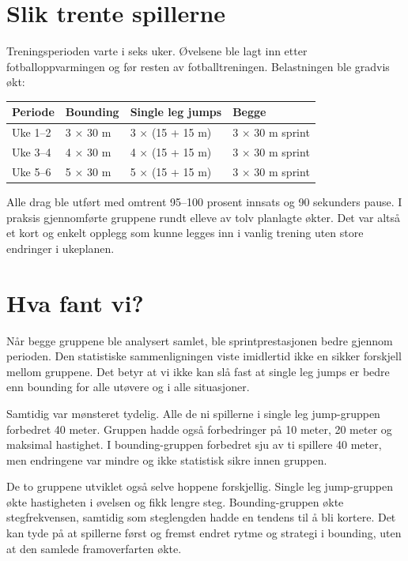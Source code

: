 \section{Slik trente spillerne}\label{slik-trente-spillerne}

Treningsperioden varte i seks uker. Øvelsene ble lagt inn etter fotballoppvarmingen og før resten av fotballtreningen. Belastningen ble gradvis økt:

\begin{center}
\sffamily\footnotesize\setlength{\tabcolsep}{3.5pt}
\begin{tabular}{@{}llll@{}}
\toprule
\textbf{Periode} & \textbf{Bounding} & \textbf{Single leg jumps} & \textbf{Begge} \\
\midrule
Uke 1–2 & 3 × 30 m & 3 × (15 + 15 m) & 3 × 30 m sprint \\
Uke 3–4 & 4 × 30 m & 4 × (15 + 15 m) & 3 × 30 m sprint \\
Uke 5–6 & 5 × 30 m & 5 × (15 + 15 m) & 3 × 30 m sprint \\
\bottomrule
\end{tabular}
\end{center}

Alle drag ble utført med omtrent 95--100 prosent innsats og 90 sekunders pause. I praksis gjennomførte gruppene rundt elleve av tolv planlagte økter. Det var altså et kort og enkelt opplegg som kunne legges inn i vanlig trening uten store endringer i ukeplanen.

\section{Hva fant vi?}\label{hva-fant-vi}

Når begge gruppene ble analysert samlet, ble sprintprestasjonen bedre gjennom perioden. Den statistiske sammenligningen viste imidlertid ikke en sikker forskjell mellom gruppene. Det betyr at vi ikke kan slå fast at single leg jumps er bedre enn bounding for alle utøvere og i alle situasjoner.

Samtidig var mønsteret tydelig. Alle de ni spillerne i single leg jump-gruppen forbedret 40 meter. Gruppen hadde også forbedringer på 10 meter, 20 meter og maksimal hastighet. I bounding-gruppen forbedret sju av ti spillere 40 meter, men endringene var mindre og ikke statistisk sikre innen gruppen.

De to gruppene utviklet også selve hoppene forskjellig. Single leg jump-gruppen økte hastigheten i øvelsen og fikk lengre steg. Bounding-gruppen økte stegfrekvensen, samtidig som steglengden hadde en tendens til å bli kortere. Det kan tyde på at spillerne først og fremst endret rytme og strategi i bounding, uten at den samlede framoverfarten økte.


